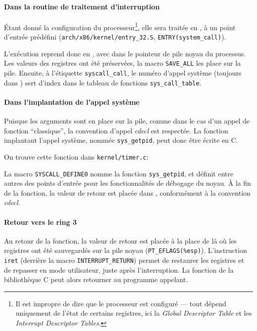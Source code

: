 \paragraph{Dans la routine de traitement d'interruption}

Étant donné la configuration du processeur\footnote{Il est impropre de dire que
le processeur est configuré --- tout dépend uniquement de l'état de certains
registres, ici la \emph{Global Descriptor Table} et les \emph{Interrupt
Descriptor Tables}.}, elle sera traitée en , à un point d'entrée
prédéfini (\verb!arch/x86/kernel/entry_32.S!, \verb!ENTRY(system_call)!).


L'exécution reprend donc en , avec dans \esp{} le pointeur de pile noyau
du processus. Les valeurs des registres ont été préservées, la macro
\texttt{SAVE\_ALL} les place sur la pile. Ensuite, à l'étiquette
\texttt{syscall\_call}, le numéro d'appel système (toujours dans \eax) sert
d'index dans le tableau de fonctions \texttt{sys\_call\_table}.


\paragraph{Dans l'implantation de l'appel système}

Puisque les arguments sont en place sur la pile, comme dans le cas d'un appel de
fonction ``classique'', la convention d'appel \emph{cdecl} est respectée. La
fonction implantant l'appel système, nommée \texttt{sys\_getpid}, peut donc être
écrite en C.

On trouve cette fonction dans \texttt{kernel/timer.c}:


La macro \texttt{SYSCALL_DEFINE0} nomme la fonction \texttt{sys\_getpid}, et
définit entre autres des points d'entrée pour les fonctionnalités de débogage du
noyau. À la fin de la fonction, la valeur de retour est placée dans \eax,
conformément à la convention \emph{cdecl}.

\paragraph{Retour vers le ring 3}

Au retour de la fonction, la valeur de retour est placée à la place de \eax{} là
où les registres ont été sauvegardés sur la pile noyau
(\texttt{PT\_EFLAGS(\%esp)}). %
L'instruction \texttt{iret} (derrière la macro
\texttt{INTERRUPT\_RETURN}) permet de restaurer les registres et de repasser en
mode utilisateur, juste après l'interruption. La fonction de la bibliothèque C
peut alors retourner au programme appelant.

